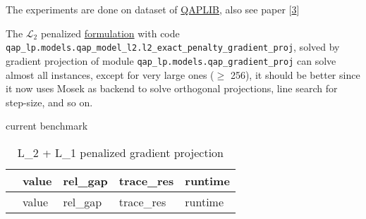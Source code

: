 \documentclass[
  10pt,
  a4paper,
,tablecaptionabove
]{scrartcl}
\begin{document}
The experiments are done on dataset of
\href{http://anjos.mgi.polymtl.ca/qaplib/}{QAPLIB}, also see paper
{[}\protect\hyperlink{ref-burkard1997qaplib}{3}{]}

The \(\mathscr L_2\) penalized
\protect\hyperlink{mathscr-l_2--mathscr-l_1-penalized-formulation}{formulation}
with code
\texttt{qap\_lp.models.qap\_model\_l2.l2\_exact\_penalty\_gradient\_proj},
solved by gradient projection of module
\texttt{qap\_lp.models.qap\_gradient\_proj} can solve almost all
instances, except for very large ones (\(\ge\) 256), it should be better
since it now uses Mosek as backend to solve orthogonal projections, line
search for step-size, and so on.

current benchmark

\begin{longtable}[]{@{}lllll@{}}
\caption{L\_2 + L\_1 penalized gradient projection}\tabularnewline
\toprule
\begin{minipage}[b]{0.11\columnwidth}\raggedright
\strut
\end{minipage} & \begin{minipage}[b]{0.20\columnwidth}\raggedright
value\strut
\end{minipage} & \begin{minipage}[b]{0.13\columnwidth}\raggedright
rel\_gap\strut
\end{minipage} & \begin{minipage}[b]{0.15\columnwidth}\raggedright
trace\_res\strut
\end{minipage} & \begin{minipage}[b]{0.15\columnwidth}\raggedright
runtime\strut
\end{minipage}\tabularnewline
\midrule
\endfirsthead
\toprule
\begin{minipage}[b]{0.11\columnwidth}\raggedright
\strut
\end{minipage} & \begin{minipage}[b]{0.20\columnwidth}\raggedright
value\strut
\end{minipage} & \begin{minipage}[b]{0.13\columnwidth}\raggedright
rel\_gap\strut
\end{minipage} & \begin{minipage}[b]{0.15\columnwidth}\raggedright
trace\_res\strut
\end{minipage} & \begin{minipage}[b]{0.15\columnwidth}\raggedright
runtime\strut
\end{minipage}\tabularnewline
\midrule
\endhead

\end{longtable}
\end{document}
